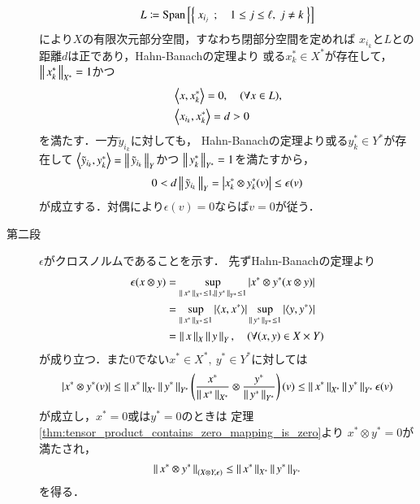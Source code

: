 \begin{prf}
\begin{description}
\begin{align}
					L \coloneqq \Span{\Set{x_{i_j}}{1 \leq j \leq \ell,\ j \neq k}}
				\end{align}
				により$X$の有限次元部分空間，すなわち閉部分空間を定めれば
				$x_{i_k}$と$L$との距離$d$は正であり，Hahn-Banachの定理より
				或る$x_k^* \in X^*$が存在して，$\left\|\, x_k^*\, \right\|_{X^*} = 1$かつ
				\begin{align}
					&\inprod<x,x_k^*> = 0, \quad (\forall x \in L), \\
					&\inprod<x_{i_k},x_k^*> = d > 0
				\end{align}
				を満たす．一方$\tilde{y}_{i_k}$に対しても，
				Hahn-Banachの定理より或る$y_k^* \in Y^*$が存在して
				$\inprod<\tilde{y}_{i_k},y_k^*> = \Norm{\tilde{y}_{i_k}}{Y}$かつ
				$\left\|\, y_k^*\, \right\|_{Y^*} = 1$を満たすから，
				\begin{align}
					0< d \left\|\, \tilde{y}_{i_k}\, \right\|_{Y} = \left| x_k^* \otimes y_k^* (v) \right|
					\leq \epsilon(v)
				\end{align}
				が成立する．対偶により$\epsilon(v) = 0$ならば$v = 0$が従う．
				
			\item[第二段]
				$\epsilon$がクロスノルムであることを示す．
				先ずHahn-Banachの定理より
				\begin{align}
					\epsilon(x \otimes y) 
					&= \sup{\Norm{x^*}{X^*}\leq 1,\Norm{y^*}{Y^*} \leq 1}{\left| x^* \otimes y^* (x \otimes y) \right|} \\
					&= \sup{\Norm{x^*}{X^*} \leq 1}{\left| \inprod<x,x^*> \right|}
					\sup{\Norm{y^*}{Y^*} \leq 1}{\left| \inprod<y,y^*> \right|} \\
					&= \Norm{x}{X} \Norm{y}{Y},
					\quad (\forall (x,y) \in X \times Y)
				\end{align}
				が成り立つ．また0でない$x^* \in X^*,\ y^* \in Y^*$に対しては
				\begin{align}
					\left| x^* \otimes y^* (v) \right|
					\leq \left\|\, x^*\, \right\|_{X^*} \left\|\, y^*\, \right\|_{Y^*} \left( \frac{x^*}{\left\|\, x^*\, \right\|_{X^*}} \otimes \frac{y^*}{\left\|\, y^*\, \right\|_{Y^*}} \right) (v)
					\leq \left\|\, x^*\, \right\|_{X^*} \left\|\, y^*\, \right\|_{Y^*} \epsilon(v)
				\end{align}
				が成立し，$x^*=0$或は$y^*=0$のときは
				定理\ref{thm:tensor_product_contains_zero_mapping_is_zero}より
				$x^* \otimes y^* = 0$が満たされ，
				\begin{align}
					\left\|\, x^* \otimes y^*\, \right\|_{(X \otimes Y,\epsilon)} \leq \left\|\, x^*\, \right\|_{X^*} \left\|\, y^*\, \right\|_{Y^*}
				\end{align}
				を得る．
			

\end{description}
\end{prf}
